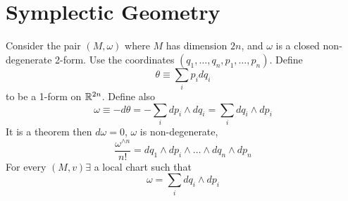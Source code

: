\documentclass[12pt]{article}
\begin{document}
\section{Symplectic Geometry}

Consider the pair $(M,\omega)$ where $M$ has dimension $2n$, and $\omega$ is a closed non-degenerate 2-form. Use the coordinates $(q_1,\dots,q_n,p_1,\dots,p_n)$. Define
$$\theta \equiv \sum_i p_idq_i$$
to be a 1-form on $\mathbb{R}^{2n}$. Define also
$$\omega \equiv -d\theta = -\sum_i dp_i \wedge dq_i = \sum_i dq_i \wedge dp_i$$
It is a theorem then $d\omega = 0$, $\omega$ is non-degenerate,
$$\frac{\omega^{\wedge n}}{n!} = dq_1 \wedge dp_i \wedge \dots \wedge dq_n \wedge dp_n$$
For every $(M,v) \exists$ a local chart such that
$$\omega = \sum_i dq_i \wedge dp_i$$
\end{document}
